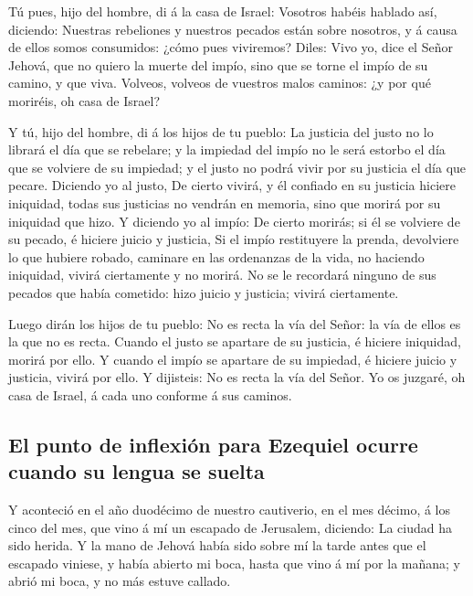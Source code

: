  Tú pues, hijo del hombre, di á la casa de Israel:
Vosotros habéis hablado así, diciendo: Nuestras rebeliones y nuestros
pecados están sobre nosotros, y á causa de ellos somos consumidos: ¿cómo
pues viviremos?  Diles: Vivo yo, dice el Señor Jehová,
que no quiero la muerte del impío, sino que se torne el impío de su
camino, y que viva. Volveos, volveos de vuestros malos caminos: ¿y por
qué moriréis, oh casa de Israel?

 Y tú, hijo del hombre, di á los hijos de tu pueblo: La
justicia del justo no lo librará el día que se rebelare; y la impiedad
del impío no le será estorbo el día que se volviere de su impiedad; y el
justo no podrá vivir por su justicia el día que pecare. 
Diciendo yo al justo, De cierto vivirá, y él confiado en su justicia
hiciere iniquidad, todas sus justicias no vendrán en memoria, sino que
morirá por su iniquidad que hizo.  Y diciendo yo al
impío: De cierto morirás; si él se volviere de su pecado, é hiciere
juicio y justicia,  Si el impío restituyere la prenda,
devolviere lo que hubiere robado, caminare en las ordenanzas de la vida,
no haciendo iniquidad, vivirá ciertamente y no morirá. 
No se le recordará ninguno de sus pecados que había cometido: hizo
juicio y justicia; vivirá ciertamente.

 Luego dirán los hijos de tu pueblo: No es recta la vía
del Señor: la vía de ellos es la que no es recta.  Cuando
el justo se apartare de su justicia, é hiciere iniquidad, morirá por
ello.  Y cuando el impío se apartare de su impiedad, é
hiciere juicio y justicia, vivirá por ello.  Y dijisteis:
No es recta la vía del Señor. Yo os juzgaré, oh casa de Israel, á cada
uno conforme á sus caminos.

\hypertarget{el-punto-de-inflexiuxf3n-para-ezequiel-ocurre-cuando-su-lengua-se-suelta}{%
\subsection{El punto de inflexión para Ezequiel ocurre cuando su lengua
se
suelta}\label{el-punto-de-inflexiuxf3n-para-ezequiel-ocurre-cuando-su-lengua-se-suelta}}

 Y aconteció en el año duodécimo de nuestro cautiverio,
en el mes décimo, á los cinco del mes, que vino á mí un escapado de
Jerusalem, diciendo: La ciudad ha sido herida.  Y la mano
de Jehová había sido sobre mí la tarde antes que el escapado viniese, y
había abierto mi boca, hasta que vino á mí por la mañana; y abrió mi
boca, y no más estuve callado.

